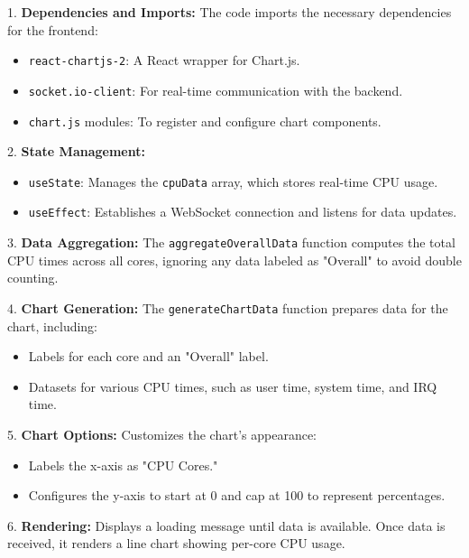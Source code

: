 \documentclass[12pt]{article}
\begin{document}
1. \textbf{Dependencies and Imports:}
   The code imports the necessary dependencies for the frontend:
   \begin{itemize}
       \item \texttt{react-chartjs-2}: A React wrapper for Chart.js.
       \item \texttt{socket.io-client}: For real-time communication with the backend.
       \item \texttt{chart.js} modules: To register and configure chart components.
   \end{itemize}

2. \textbf{State Management:}
   \begin{itemize}
       \item \texttt{useState}: Manages the \texttt{cpuData} array, which stores real-time CPU usage.
       \item \texttt{useEffect}: Establishes a WebSocket connection and listens for data updates.
   \end{itemize}

3. \textbf{Data Aggregation:}
   The \texttt{aggregateOverallData} function computes the total CPU times across all cores, ignoring any data labeled as "Overall" to avoid double counting.

4. \textbf{Chart Generation:}
   The \texttt{generateChartData} function prepares data for the chart, including:
   \begin{itemize}
       \item Labels for each core and an "Overall" label.
       \item Datasets for various CPU times, such as user time, system time, and IRQ time.
   \end{itemize}

5. \textbf{Chart Options:}
   Customizes the chart's appearance:
   \begin{itemize}
       \item Labels the x-axis as "CPU Cores."
       \item Configures the y-axis to start at 0 and cap at 100 to represent percentages.
   \end{itemize}

6. \textbf{Rendering:}
   Displays a loading message until data is available. Once data is received, it renders a line chart showing per-core CPU usage.
\end{document}

